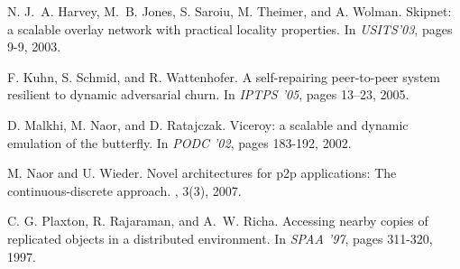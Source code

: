 \documentclass[11pt]{article}
\begin{document}
\begin{thebibliography}{10}
N. J.~A. Harvey, M.~B. Jones, S. Saroiu, M. Theimer, and
  A. Wolman.
\newblock Skipnet: a scalable overlay network with practical locality
  properties.
\newblock In {\em USITS'03}, pages 9-9, 2003. 
  
F. Kuhn, S. Schmid, and R. Wattenhofer.
\newblock A self-repairing peer-to-peer system resilient to dynamic adversarial
  churn.
\newblock In {\em IPTPS '05}, pages 13--23, 2005.

D. Malkhi, M. Naor, and D. Ratajczak.
\newblock Viceroy: a scalable and dynamic emulation of the butterfly.
\newblock In {\em PODC '02}, pages 183-192, 2002.
  
M. Naor and U. Wieder.
\newblock Novel architectures for p2p applications: The continuous-discrete
  approach.
, 3(3), 2007.


C. G. Plaxton, R. Rajaraman, and A.~W. Richa.
\newblock Accessing nearby copies of replicated objects in a distributed
environment.
\newblock In {\em SPAA '97}, pages 311-320, 1997.

\end{thebibliography}
\end{document}
